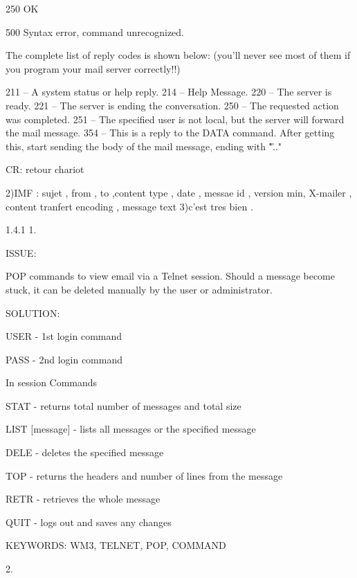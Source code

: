 250 OK

500 Syntax error, command unrecognized.

The complete list of reply codes is shown below: (you'll never see most of them if you program your mail server correctly!!)

211
    -- A system status or help reply. 
214
    -- Help Message. 
220
    -- The server is ready. 
221
    -- The server is ending the conversation. 
250
    -- The requested action was completed. 
251
    -- The specified user is not local, but the server will forward the mail message. 
354
    -- This is a reply to the DATA command. After getting this, start sending the body of the mail message, ending with "\r\n.\r\n." 

CR: retour chariot

2)IMF : sujet , from , to ,content type , date , messae id , version min, X-mailer , content tranfert encoding , message text
3)c'est tres bien .

1.4.1
1. 

ISSUE:

POP commands to view email via a Telnet session. Should a message become stuck, it can be deleted manually by the user or administrator.

SOLUTION:

USER - 1st login command

PASS - 2nd login command

In session Commands

STAT - returns total number of messages and total size

LIST [message] - lists all messages or the specified message

DELE - deletes the specified message

TOP - returns the headers and number of lines from the message

RETR - retrieves the whole message

QUIT - logs out and saves any changes

KEYWORDS: WM3, TELNET, POP, COMMAND


2.


